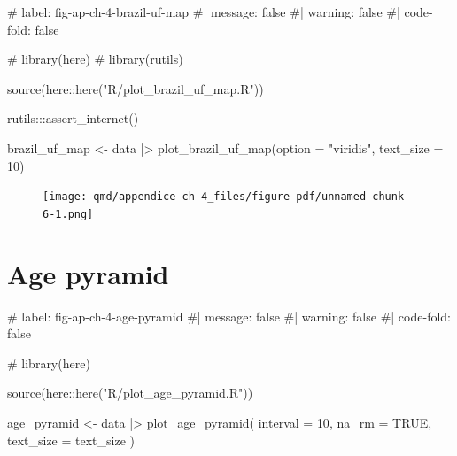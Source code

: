 \documentclass[
  12pt,
  a4paper,
  oneside]{tesesusp}
\newenvironment{Shaded}{\begin{snugshade}}{\end{snugshade}}
\newcommand{\AttributeTok}[1]{\textcolor[rgb]{0.40,0.45,0.13}{#1}}
\newcommand{\CommentTok}[1]{\textcolor[rgb]{0.37,0.37,0.37}{#1}}
\newcommand{\ConstantTok}[1]{\textcolor[rgb]{0.56,0.35,0.01}{#1}}
\newcommand{\DecValTok}[1]{\textcolor[rgb]{0.68,0.00,0.00}{#1}}
\newcommand{\FunctionTok}[1]{\textcolor[rgb]{0.28,0.35,0.67}{#1}}
\newcommand{\NormalTok}[1]{\textcolor[rgb]{0.00,0.23,0.31}{#1}}
\newcommand{\OtherTok}[1]{\textcolor[rgb]{0.00,0.23,0.31}{#1}}
\newcommand{\SpecialCharTok}[1]{\textcolor[rgb]{0.37,0.37,0.37}{#1}}
\newcommand{\StringTok}[1]{\textcolor[rgb]{0.13,0.47,0.30}{#1}}
\begin{document}
\begin{Shaded}
\begin{Highlighting}[numbers=left,,]
\CommentTok{\# label: fig{-}ap{-}ch{-}4{-}brazil{-}uf{-}map}
\CommentTok{\#| message: false}
\CommentTok{\#| warning: false}
\CommentTok{\#| code{-}fold: false}

\CommentTok{\# library(here)}
\CommentTok{\# library(rutils)}

\FunctionTok{source}\NormalTok{(here}\SpecialCharTok{::}\FunctionTok{here}\NormalTok{(}\StringTok{"R/plot\_brazil\_uf\_map.R"}\NormalTok{))}

\NormalTok{rutils}\SpecialCharTok{:::}\FunctionTok{assert\_internet}\NormalTok{()}

\NormalTok{brazil\_uf\_map }\OtherTok{\textless{}{-}} 
\NormalTok{  data }\SpecialCharTok{|\textgreater{}} 
  \FunctionTok{plot\_brazil\_uf\_map}\NormalTok{(}\AttributeTok{option =} \StringTok{"viridis"}\NormalTok{, }\AttributeTok{text\_size =} \DecValTok{10}\NormalTok{)}
\end{Highlighting}
\end{Shaded}

\begin{figure}[H]

{\centering \texttt{[image: qmd/appendice-ch-4\_files/figure-pdf/unnamed-chunk-6-1.png]}

}

\end{figure}

\hypertarget{age-pyramid}{%
\section{Age pyramid}\label{age-pyramid}}

\begin{Shaded}
\begin{Highlighting}[numbers=left,,]
\CommentTok{\# label: fig{-}ap{-}ch{-}4{-}age{-}pyramid}
\CommentTok{\#| message: false}
\CommentTok{\#| warning: false}
\CommentTok{\#| code{-}fold: false}

\CommentTok{\# library(here)}

\FunctionTok{source}\NormalTok{(here}\SpecialCharTok{::}\FunctionTok{here}\NormalTok{(}\StringTok{"R/plot\_age\_pyramid.R"}\NormalTok{))}

\NormalTok{age\_pyramid }\OtherTok{\textless{}{-}} 
\NormalTok{  data }\SpecialCharTok{|\textgreater{}} 
  \FunctionTok{plot\_age\_pyramid}\NormalTok{(}
    \AttributeTok{interval =} \DecValTok{10}\NormalTok{, }
    \AttributeTok{na\_rm =} \ConstantTok{TRUE}\NormalTok{, }
    \AttributeTok{text\_size =}\NormalTok{ text\_size}
\NormalTok{  )}
\end{Highlighting}
\end{Shaded}
\end{document}

